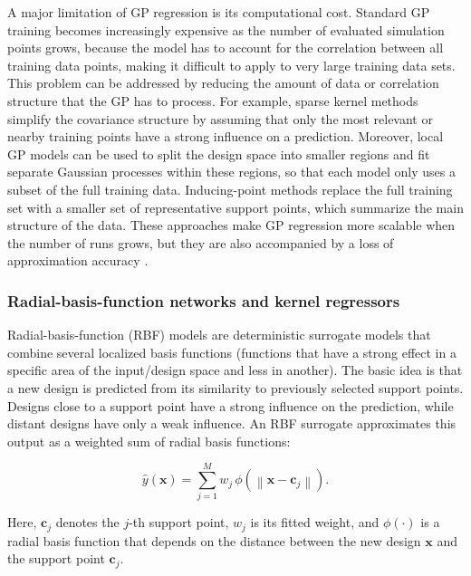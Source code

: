 \documentclass[final,5p,times,twocolumn]{elsarticle}
\begin{document}
A major limitation of GP regression is its computational cost. Standard
GP training becomes increasingly expensive as the number of evaluated
simulation points grows, because the model has to account for the
correlation between all training data points, making it difficult to
apply to very large training data sets. This problem can be addressed by
reducing the amount of data or correlation structure that the GP has to
process. For example, sparse kernel methods simplify the covariance
structure by assuming that only the most relevant or nearby training
points have a strong influence on a prediction. Moreover, local GP
models can be used to split the design space into smaller regions and
fit separate Gaussian processes within these regions, so that each model
only uses a subset of the full training data. Inducing-point methods
replace the full training set with a smaller set of representative
support points, which summarize the main structure of the data. These
approaches make GP regression more scalable when the number of runs
grows, but they are also accompanied by a loss of approximation
accuracy \cite{Hu2020,Volodina2022,Liu20222679}.

\subsubsection{Radial-basis-function networks and kernel regressors}
\label{sec:tax:rbf}

Radial-basis-function (RBF) models are deterministic surrogate models
that combine several localized basis functions (functions that have a
strong effect in a specific area of the input/design space and less in
another). The basic idea is that a new design is predicted from its
similarity to previously selected support points. Designs close to a
support point have a strong influence on the prediction, while distant
designs have only a weak influence. An RBF surrogate approximates this
output as a weighted sum of radial basis functions:

$$\begin{equation}
 \hat{y}(\mathbf{x}) = \sum_{j=1}^{M} w_j \, \phi\left(\left\| \mathbf{x} - \mathbf{c}_j \right\|\right).
\end{equation}$$

Here, $\mathbf{c}_j$ denotes the $j$-th support point, $w_j$ is its
fitted weight, and $\phi(\cdot)$ is a radial basis function that depends
on the distance between the new design $\mathbf{x}$ and the support
point $\mathbf{c}_j$.
\end{document}
